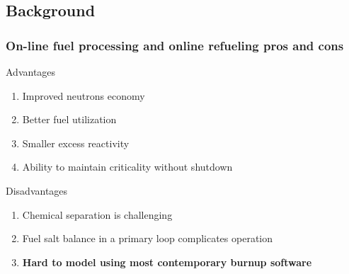 \subsection{Background}


\begin{frame}
\frametitle{On-line fuel processing and online refueling pros and cons}
\begin{block}{Advantages}
	\begin{enumerate}
		\item Improved neutrons economy
		\item Better fuel utilization
		\item Smaller excess reactivity
		\item Ability to maintain criticality without shutdown
	\end{enumerate}
\end{block}

\begin{block}{Disadvantages}
	\begin{enumerate}
		\item Chemical separation is challenging
		\item Fuel salt balance in a primary loop complicates operation
		\item \textbf{Hard to model using most contemporary burnup software}
	\end{enumerate}
\end{block}

\end{frame}



